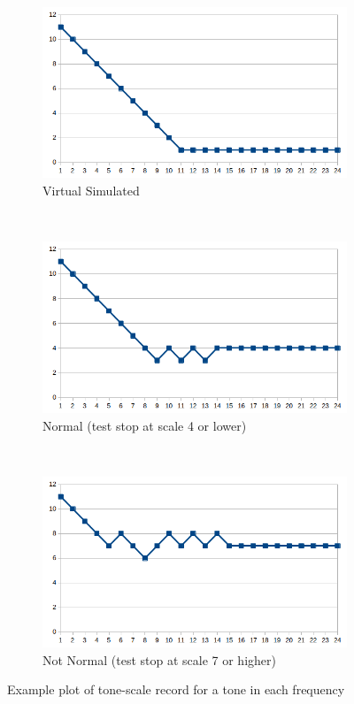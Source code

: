 \documentclass[a4paper,12pt,oneside,pdflatex,italian,final,twocolumn]{article}
\begin{document}
\begin{figure}[h]
    \centering
    \begin{subfigure}[b]{0.45\textwidth}
        \includegraphics[width=\textwidth]{images/plot_record_perfect.png}
        \caption{Virtual Simulated}
    \end{subfigure}
    ~
    \begin{subfigure}[b]{0.45\textwidth}
        \includegraphics[width=\textwidth]{images/plot_record_normal.png}
        \caption{Normal (test stop at scale 4 or lower)}
    \end{subfigure}
    ~
    \begin{subfigure}[b]{0.45\textwidth}
        \includegraphics[width=\textwidth]{images/plot_record_mild.png}
        \caption{Not Normal (test stop at scale 7 or higher)}
    \end{subfigure}

    \caption{Example plot of tone-scale record for a tone in each frequency}
\end{figure}
\end{document}
